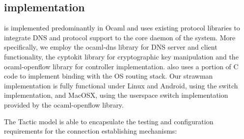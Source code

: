 \subsection{\signpost implementation} \label{sec:sp-implementation}

\signpost is implemented predominantly in Ocaml and uses existing protocol
libraries to integrate DNS and \of protocol support to the core daemon of the
system.  More specifically, we employ the ocaml-dns library for DNS server and
client functionality, the cyptokit library for cryptographic key manipulation
and the ocaml-openflow library for \of controller implementation. \signpost also
uses a portion of C code to implement binding with the OS routing stack. Our
strawman implementation is fully functional under Linux and Android, using the
\ovs switch implementation, and MacOSX, using the userspace switch
implementation provided by the ocaml-openflow library.

The \signpost Tactic model is able to encapsulate the testing and configuration
requirements for the connection establishing mechanisms: 

